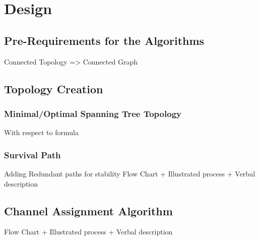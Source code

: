 \chapter{Design}
\section{Pre-Requirements for the Algorithms}
Connected Topology => Connected Graph
\section{Topology Creation}
  \subsection{Minimal/Optimal Spanning Tree Topology}
    With respect to formula \newline
  \subsection{Survival Path}
    Adding Redundant paths for stability
    Flow Chart + Illustrated process + Verbal description
\section{Channel Assignment Algorithm}
  \cite{caa_tricky}
  Flow Chart + Illustrated process + Verbal description

